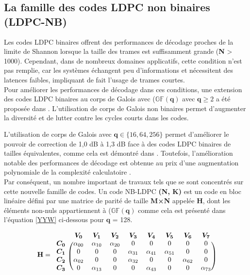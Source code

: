 \documentclass[../main.tex]{subfiles}
\begin{document}
\subsection{La famille des codes LDPC non binaires (LDPC-NB)}
% 
% 
% 
% 
Les codes LDPC binaires offrent des performances de décodage proches de la limite de Shannon lorsque la taille des trames est suffisamment grande (\textbf{N} > 1000). Cependant, dans de nombreux domaines applicatifs, cette condition n’est pas remplie, car les systèmes échangent peu d’informations et nécessitent des latences faibles, impliquant de fait l’usage de trames courtes. \\
Pour améliorer les performances de décodage dans ces conditions, une extension des codes LDPC binaires au corps de Galois avec ($\mathbb{GF}(\bm{q})$ avec $\bm{q} \ge 2$ a été proposée dans \cite{NBLDPC:1,NBLDPC:2}. L’utilisation de corps de Galois non binaires permet d’augmenter la diversité et de lutter contre les cycles courts dans les codes. 

L’utilisation de corps de Galois avec $\bm{q} \in{\{16, 64, 256\}}$ permet d’améliorer le pouvoir de correction de 1,0 dB à 1,3 dB face à des codes LDPC binaires de tailles équivalentes, comme cela est démontré dans \cite{CCSDS:NB,NBLDPC:3}. Toutefois, l’amélioration notable des performances de décodage est obtenue au prix d’une augmentation polynomiale de la complexité calculatoire \cite{NBLDPC:1}. \\
Par conséquent, un nombre important de travaux tels que \cite{survey:NB} se sont concentrés sur cette nouvelle famille de codes. Un code NB-LDPC \textbf{(N, K)} est un code en bloc linéaire défini par une matrice de parité de taille \textbf{M×N} appelée \textbf{H}, dont les éléments non-nuls appartiennent à ($\mathbb{GF}(\bm{q})$ comme cela est présenté dans l’équation \ref{YYW} ci-dessous pour $\bm{q}$ = 128.



\begin{equation}
\mathbf{H}=
\begin{blockarray}{ccccccccc}
     & \bm{V_0} & \bm{V_1}  & \bm{V_2}    & \bm{V_3}    & \bm{V_4}    & \bm{V_5} & \bm{V_6} & \bm{V_7} \\
\begin{block}{c(cccccccc)}
  \bm{C_0} & \alpha_{00}    & \alpha_{10} & \alpha_{20}  & 0          &        0  & 0  & 0  & 0 \\
  \bm{C_1} & 0              & 0           & 0           & \alpha_{31} & \alpha_{41}  & \alpha_{51}  & 0  & 0 \\
  \bm{C_2} & \alpha_{02}    & 0           & 0           & \alpha_{32} & 0         & 0  & \alpha_{62}  & 0 \\
  \bm{C_3} & 0              & \alpha_{13} & 0           &  0          & \alpha_{43}        & 0  & 0  & \alpha_ {73} \\
\end{block}
\end{blockarray}
\label{YYW}
\end{equation}
\end{document}
